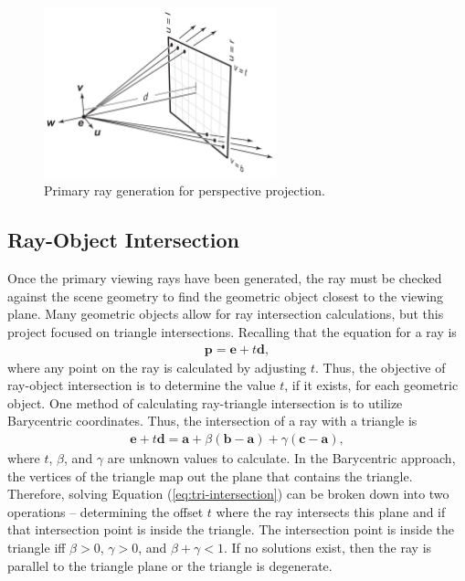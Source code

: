 \documentclass[letterpaper, 11pt, onecolumn, oneside]{article}
\begin{document}
        \begin{figure}
            \includegraphics[width=0.6\textwidth]{perspective-ray-generation.png}
            \centering
            \caption{Primary ray generation for perspective projection. \cite{stevemarschner2015}}
            \label{fig:perspective-ray-generation}
        \end{figure}

    \subsection{Ray-Object Intersection}
    \label{section:ray-object-intersection}
        Once the primary viewing rays have been generated, the ray must be checked against the scene geometry to find the geometric object closest to the viewing plane.
        Many geometric objects allow for ray intersection calculations, but this project focused on triangle intersections.
        Recalling that the equation for a ray is
        \begin{align}
            \boldsymbol{p} = \boldsymbol{e} + t\boldsymbol{d},
        \end{align}
        where any point on the ray is calculated by adjusting $t$.
        Thus, the objective of ray-object intersection is to determine the value $t$, if it exists, for each geometric object.
        One method of calculating ray-triangle intersection is to utilize Barycentric coordinates.
        Thus, the intersection of a ray with a triangle is
        \begin{align} \label{eq:tri-intersection}
            \boldsymbol{e} + t\boldsymbol{d} = \boldsymbol{a} + \beta (\boldsymbol{b} - \boldsymbol{a}) + \gamma (\boldsymbol{c} - \boldsymbol{a}),
        \end{align}
        where $t$, $\beta$, and $\gamma$ are unknown values to calculate.
        In the Barycentric approach, the vertices of the triangle map out the plane that contains the triangle.
        Therefore, solving Equation (\ref{eq:tri-intersection}) can be broken down into two operations -- determining the offset $t$ where the ray intersects this plane and if that intersection point is inside the triangle.
        The intersection point is inside the triangle iff $\beta > 0$, $\gamma > 0$, and $\beta + \gamma < 1$.
        If no solutions exist, then the ray is parallel to the triangle plane or the triangle is degenerate.
\end{document}

